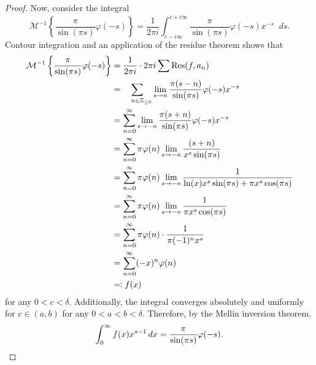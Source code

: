 \documentclass[a4paper]{article}
\newcommand*\diff{\mathop{}\!d} %
\newcommand{\Z}{\mathbb{Z}}
\DeclareMathOperator{\Res}{Res}
\theoremstyle{definition}
\begin{document}
\begin{proof}
    Now, consider the integral
    \begin{equation*}
        \mathcal{M}^{-1}\left\{\frac{\pi}{\sin(\pi s)} \varphi(-s) \right\} = \frac{1}{2\pi i} \int_{c-i\infty}^{c+i\infty} \frac{\pi}{\sin(\pi s)} \varphi(-s) x^{-s} \diff s.
    \end{equation*}
    Contour integration and an application of the residue theorem shows that
    \begin{align*}
        \mathcal{M}^{-1}\left\{\frac{\pi}{\sin(\pi s)} \varphi(-s) \right\} & = \frac{1}{2\pi i} \cdot 2\pi i \sum \Res(f, a_n)                                                              \\
                                                                            & = \sum_{\hphantom{_{\leq 0}} n \in \Z_{\leq 0}} \lim_{s \to n} \frac{\pi(s-n)}{\sin(\pi s)} \varphi(-s) x^{-s} \\
                                                                            & = \sum_{n=0}^\infty \lim_{s \to -n} \frac{\pi(s+n)}{\sin(\pi s)} \varphi(-s) x^{-s}                            \\
                                                                            & = \sum_{n=0}^\infty \pi \varphi(n) \lim_{s \to -n} \frac{(s+n)}{x^s \sin(\pi s)}                               \\
                                                                            & = \sum_{n=0}^\infty \pi \varphi(n) \lim_{s \to -n} \frac{1}{\ln(x)x^s\sin(\pi s) + \pi x^s\cos(\pi s)}         \\
                                                                            & = \sum_{n=0}^\infty \pi \varphi(n) \lim_{s \to -n} \frac{1}{\pi x^s\cos(\pi s)}                                \\
                                                                            & = \sum_{n=0}^\infty \pi \varphi(n) \cdot \frac{1}{\pi(-1)^n x^s}                                               \\
                                                                            & = \sum_{n=0}^\infty (-x)^n \varphi(n)                                                                          \\
                                                                            & \eqcolon f(x)
    \end{align*}
    for any $0 < c < \delta$.
    Additionally, the integral converges absolutely and uniformly for $c \in (a,b)$ for any $0 < a < b < \delta$.
    Therefore, by the Mellin inversion theorem,
    \begin{equation*}
        \int_0^\infty f(x) x^{s-1} \diff x = \frac{\pi}{\sin(\pi s)} \varphi(-s). \qedhere
    \end{equation*}
\end{proof}
\end{document}
